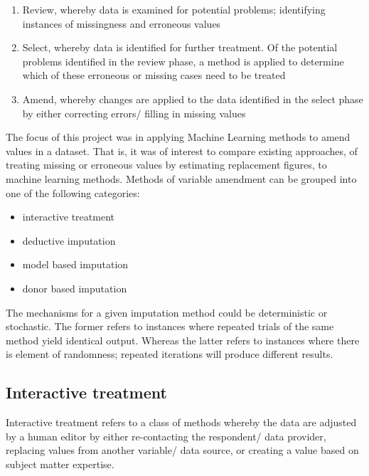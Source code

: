 \documentclass[]{book}
\providecommand{\tightlist}{%
  \setlength{\itemsep}{0pt}\setlength{\parskip}{0pt}}
\begin{document}
\begin{enumerate}
\def\labelenumi{\arabic{enumi})}
\tightlist
\item
  Review, whereby data is examined for potential problems; identifying
  instances of missingness and erroneous values\\
\item
  Select, whereby data is identified for further treatment. Of the
  potential problems identified in the review phase, a method is applied
  to determine which of these erroneous or missing cases need to be
  treated
\item
  Amend, whereby changes are applied to the data identified in the
  select phase by either correcting errors/ filling in missing values
\end{enumerate}

The focus of this project was in applying Machine Learning methods to
amend values in a dataset. That is, it was of interest to compare
existing approaches, of treating missing or erroneous values by
estimating replacement figures, to machine learning methods. Methods of
variable amendment can be grouped into one of the following categories:

\begin{itemize}
\tightlist
\item
  interactive treatment\\
\item
  deductive imputation\\
\item
  model based imputation\\
\item
  donor based imputation
\end{itemize}

The mechanisms for a given imputation method could be deterministic or
stochastic. The former refers to instances where repeated trials of the
same method yield identical output. Whereas the latter refers to
instances where there is element of randomness; repeated iterations will
produce different results.

\subsection{Interactive treatment}\label{interactive-treatment}

Interactive treatment refers to a class of methods whereby the data are
adjusted by a human editor by either re-contacting the respondent/ data
provider, replacing values from another variable/ data source, or
creating a value based on subject matter expertise.
\end{document}
